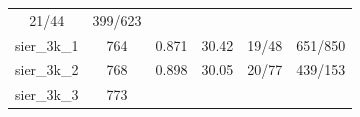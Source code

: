 \documentclass[]{article}
\begin{document}
\begin{longtable}[]{@{}cccccc@{}}
\begin{minipage}[t]{0.18\columnwidth}
21/44\strut
\end{minipage} & \begin{minipage}[t]{0.22\columnwidth}\centering\strut
399/623\strut
\end{minipage}\tabularnewline
\begin{minipage}[t]{0.11\columnwidth}\centering\strut
sier\_3k\_1\strut
\end{minipage} & \begin{minipage}[t]{0.07\columnwidth}\centering\strut
764\strut
\end{minipage} & \begin{minipage}[t]{0.11\columnwidth}\centering\strut
0.871\strut
\end{minipage} & \begin{minipage}[t]{0.13\columnwidth}\centering\strut
30.42\strut
\end{minipage} & \begin{minipage}[t]{0.18\columnwidth}\centering\strut
19/48\strut
\end{minipage} & \begin{minipage}[t]{0.22\columnwidth}\centering\strut
651/850\strut
\end{minipage}\tabularnewline
\begin{minipage}[t]{0.11\columnwidth}\centering\strut
sier\_3k\_2\strut
\end{minipage} & \begin{minipage}[t]{0.07\columnwidth}\centering\strut
768\strut
\end{minipage} & \begin{minipage}[t]{0.11\columnwidth}\centering\strut
0.898\strut
\end{minipage} & \begin{minipage}[t]{0.13\columnwidth}\centering\strut
30.05\strut
\end{minipage} & \begin{minipage}[t]{0.18\columnwidth}\centering\strut
20/77\strut
\end{minipage} & \begin{minipage}[t]{0.22\columnwidth}\centering\strut
439/153\strut
\end{minipage}\tabularnewline
\begin{minipage}[t]{0.11\columnwidth}\centering\strut
sier\_3k\_3\strut
\end{minipage} & \begin{minipage}[t]{0.07\columnwidth}\centering\strut
773\strut
\end{minipage} & \begin{minipage}[t]{0.11\columnwidth}\centering\strut

\end{minipage}
\end{longtable}
\end{document}
